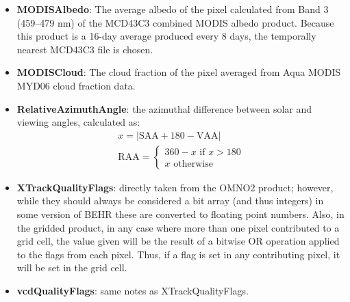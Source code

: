 \documentclass[12pt]{article}
\begin{document}
\begin{itemize}
	\item \textbf{MODISAlbedo}: The average albedo of the pixel calculated from Band 3 (459--479 nm) of the MCD43C3 combined MODIS albedo product. Because this product is a 16-day average produced every 8 days, the temporally nearest MCD43C3 file is chosen.
	
	\item \textbf{MODISCloud}: The cloud fraction of the pixel averaged from Aqua MODIS MYD06 cloud fraction data.
	
	\item \textbf{RelativeAzimuthAngle}: the azimuthal difference between solar and viewing angles, calculated as:
	\begin{align*}
		x = |\mathrm{SAA} + 180 - \mathrm{VAA}| \\
		\mathrm{RAA} = \left\{ 
				\begin{matrix}
					360 - x \text{ if } x > 180 \\
					x	\text{ otherwise}
				\end{matrix}
			\right.
	\end{align*}
	
	\item \textbf{XTrackQualityFlags}: directly taken from the OMNO2 product; however, while they should always be considered a bit array (and thus integers) in some version of BEHR these are converted to floating point numbers.  Also, in the gridded product, in any case where more than one pixel contributed to a grid cell, the value given will be the result of a bitwise OR operation applied to the flags from each pixel. Thus, if a flag is set in any contributing pixel, it will be set in the grid cell.
	
	\item \textbf{vcdQualityFlags}: same notes as XTrackQualityFlags.
	
	\end{itemize}
\end{document}
